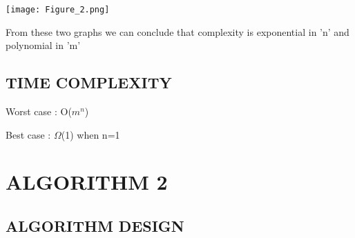 \documentclass[conference]{IEEEtran}
\begin{document}
\texttt{[image: Figure\_2.png]}


From these two graphs we can conclude that complexity is exponential in 'n' and polynomial in 'm'

\subsection{TIME COMPLEXITY}

Worst case : O($m^{n}$)

Best case  : $\Omega$(1) when n=1

\section{ALGORITHM 2}

\subsection{ALGORITHM DESIGN}
\end{document}
